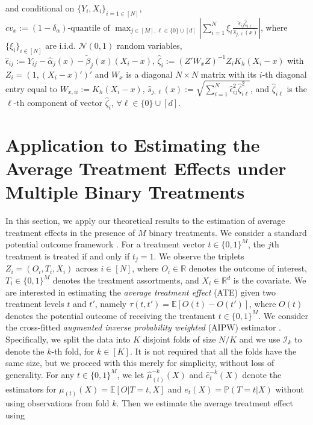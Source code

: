 \documentclass[11pt]{article}
\begin{document}
and conditional on $\{Y_i,X_i\}_{i=1\in[N]}$, $cv_x := (1-\delta_\alpha)\mbox{-quantile of } {\displaystyle\max_{ j \in  [M], \ell \in\{0\}\cup[d]}}\displaystyle\left|\sum_{i=1}^N \xi_i \frac{\hat \epsilon_{ij} \hat{\zeta}_{i\ell}}{\hat s_{j,\ell}(x)}\right|$, where $\{\xi_i\}_{i\in[N]}$ are i.i.d. $\mathcal{N}(0,1)$ random variables, $\hat\epsilon_{ij}:=Y_{ij} - \hat{\alpha}_j(x)-\tilde\beta_j(x)(X_i-x)$, $\hat{\zeta}_{i} := (Z'W_xZ)^{-1}Z_i K_h(X_i-x)$  with $Z_i=(1, (X_i-x)')'$ and $W_{x}$ is a diagonal $N\times N$ matrix with its $i$-th diagonal entry equal to $W_{x,ii}:=K_h(X_i-x)$, $\hat s_{j,\ell}(x) := \sqrt{\sum_{i=1}^N \hat \epsilon_{ij}^2 \hat{\zeta}_{i\ell}^2}$, and $\hat{\zeta}_{i\ell}$ is the $\ell$-th component of vector $\hat{\zeta}_i$, $\forall \ell\in\{0\}\cup[d]$.

\section{Application to Estimating the Average Treatment Effects under Multiple Binary Treatments}\label{section:causal}
In this section, we apply our theoretical results to the estimation of average treatment effects in the presence of $M$ binary treatments. We consider a standard potential outcome framework \citep{imbens2015causal}. For a treatment vector $t \in \{0,1\}^M$, the $j$th treatment is treated if and only if $t_j = 1$. We observe the triplets $Z_i=(O_i,T_i,X_i)$ across $i\in[N]$, where $O_i\in\mathbb{R}$ denotes the outcome of interest, $T_i \in \{0,1\}^M$ denotes the treatment assortments, and $X_i \in \mathbb{R}^d$ is the covariate. We are interested in estimating the \textit{average treatment effect} (ATE) given two treatment levels $t$ and $t'$, namely $\tau(t,t') = \mathbb{E}[ O(t) - O(t')]$, where $O(t)$ denotes the potential outcome of receiving the treatment $t\in \{0,1\}^M$. We consider the cross-fitted \textit{augmented inverse probability weighted} (AIPW) estimator \citep[e.g.][]{robins1994estimation,robins1995semiparametric,hahn1998role,scharfstein1999adjusting,kennedy2020towards,newey2018cross}. 
Specifically, we split the data into $K$ disjoint folds of size $N/K$ and we use $\mathcal{I}_k$ to denote the $k$-th fold, for $k\in[K]$. It is not required that all the folds have the same size, but we proceed with this merely for simplicity, without loss of generality. For any $t\in\{0,1\}^M$, we let $\hat{\mu}_{(t)}^{-k}(X)$ and $\hat e_t^{-k}(X)$ denote the estimators for $\mu_{(t)}(X)=\mathbb{E}[O|T=t,X]$ and $e_t(X)=\mathbb{P}(T=t|X)$ without using observations from fold $k$. Then we estimate the average treatment effect using
\end{document}
